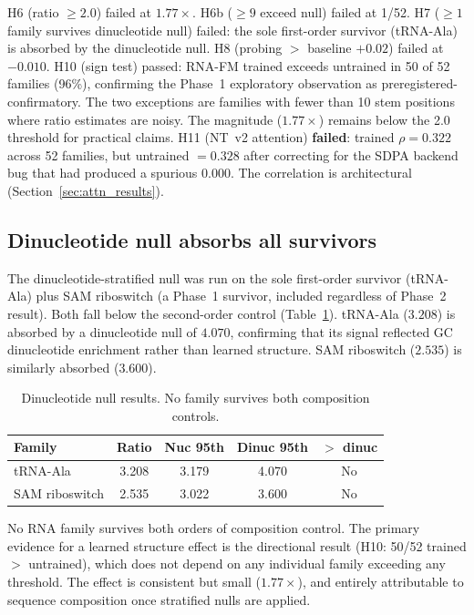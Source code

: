 \documentclass[11pt]{article}
\begin{document}
H6 (ratio $\geq 2.0$) failed at $1.77\times$.  H6b ($\geq 9$ exceed
null) failed at 1/52.  H7 ($\geq 1$ family survives dinucleotide
null) failed: the sole first-order survivor (tRNA-Ala) is absorbed by
the dinucleotide null.  H8 (probing $>$ baseline $+ 0.02$) failed at
$-0.010$.  H10 (sign test) passed: RNA-FM trained exceeds untrained in
50 of 52 families (96\%), confirming the Phase~1 exploratory
observation as preregistered-confirmatory.  The two exceptions are
families with fewer than 10 stem positions where ratio estimates are
noisy.  The magnitude ($1.77\times$) remains below the 2.0 threshold
for practical claims.  H11 (NT~v2 attention) \textbf{failed}: trained $\rho =
0.322$ across 52 families, but untrained $= 0.328$ after correcting
for the SDPA backend bug that had produced a spurious $0.000$.  The
correlation is architectural (Section~\ref{sec:attn_results}).

\subsection{Dinucleotide null absorbs all survivors}
\label{sec:dinuc_results}

The dinucleotide-stratified null was run on the sole first-order
survivor (tRNA-Ala) plus SAM riboswitch (a Phase~1 survivor, included
regardless of Phase~2 result).  Both fall below the second-order
control (Table~\ref{tab:dinuc}).  tRNA-Ala ($3.208$) is absorbed by a
dinucleotide null of $4.070$, confirming that its signal reflected GC
dinucleotide enrichment rather than learned structure.  SAM riboswitch
($2.535$) is similarly absorbed ($3.600$).

\begin{table}[t]
\centering
\caption{Dinucleotide null results.  No family survives both
  composition controls.}
\label{tab:dinuc}
\begin{tabular}{@{}lcccc@{}}
\toprule
\textbf{Family} & \textbf{Ratio} &
  \textbf{Nuc 95th} & \textbf{Dinuc 95th} & \textbf{$>$ dinuc} \\
\midrule
tRNA-Ala          & 3.208 & 3.179 & 4.070 & No \\
SAM riboswitch    & 2.535 & 3.022 & 3.600 & No \\
\bottomrule
\end{tabular}
\end{table}

No RNA family survives both orders of composition control.  The
primary evidence for a learned structure effect is the directional
result (H10: 50/52 trained $>$ untrained), which does not depend on
any individual family exceeding any threshold.  The effect is
consistent but small ($1.77\times$), and entirely attributable to
sequence composition once stratified nulls are applied.
\end{document}
